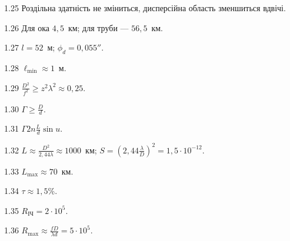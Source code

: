 \begin{Solution}{1.{25}}
        Роздільна здатність не зміниться, дисперсійна область зменшиться вдвічі.
    
\end{Solution}
\begin{Solution}{1.{26}}
        Для ока $4,5$~км; для труби --- $56,5$~км.
    
\end{Solution}
\begin{Solution}{1.{27}}
        $l = 52$~м; $\phi_d = 0,055''$.
    
\end{Solution}
\begin{Solution}{1.{28}}
        $\ell_{\min}\approx 1$~м.
    
\end{Solution}
\begin{Solution}{1.{29}}
        $\frac{D^2}{f^2} \ge z^2\lambda^2 \approx 0,25$.
    
\end{Solution}
\begin{Solution}{1.{30}}
        $\Gamma \ge \frac{D}{d}$.
    
\end{Solution}
\begin{Solution}{1.{31}}
        $\Gamma 2n  \frac{L}{d}\sin u$.
    
\end{Solution}
\begin{Solution}{1.{32}}
        $L \approx \frac{D^2}{2,44 \lambda} \approx 1000$~км; $ S = \left( 2,44\frac{\lambda}{D} \right)^2 = 1,5\cdot10^{-12}$.
    
\end{Solution}
\begin{Solution}{1.{33}}
        $L_{\max} \approx 70$~км.
    
\end{Solution}
\begin{Solution}{1.{34}}
        $\tau \approx 1,5$\%.
    
\end{Solution}
\begin{Solution}{1.{35}}
        $R_\text{ІЧ} = 2\cdot10^5$.
    
\end{Solution}
\begin{Solution}{1.{36}}
        $R_{\max} \approx \frac{fD}{\lambda d} = 5\cdot10^5$.
    
\end{Solution}
